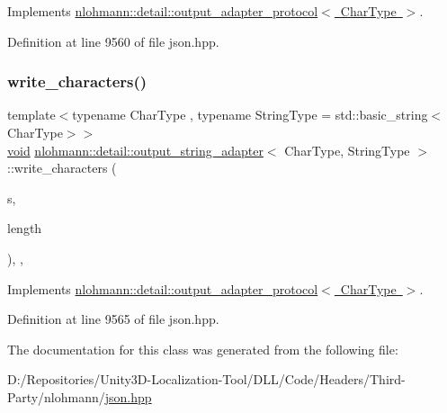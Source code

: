 Implements \mbox{\hyperlink{structnlohmann_1_1detail_1_1output__adapter__protocol_a3381896fe1be557f591de2e917cdc7d5}{nlohmann\+::detail\+::output\+\_\+adapter\+\_\+protocol$<$ Char\+Type $>$}}.



Definition at line 9560 of file json.\+hpp.

\mbox{\label{classnlohmann_1_1detail_1_1output__string__adapter_ab5ea4da075305d225dfd84ad997e8747}} 
\subsubsection{\texorpdfstring{write\_characters()}{write\_characters()}}
{\footnotesize\ttfamily template$<$typename Char\+Type , typename String\+Type  = std\+::basic\+\_\+string$<$\+Char\+Type$>$$>$ \\
\mbox{\hyperlink{namespacenlohmann_1_1detail_a59fca69799f6b9e366710cb9043aa77d}{void}} \mbox{\hyperlink{classnlohmann_1_1detail_1_1output__string__adapter}{nlohmann\+::detail\+::output\+\_\+string\+\_\+adapter}}$<$ Char\+Type, String\+Type $>$\+::write\+\_\+characters (\begin{DoxyParamCaption}\item[{const Char\+Type $\ast$}]{s,  }\item[{std\+::size\+\_\+t}]{length }\end{DoxyParamCaption})\hspace{0.3cm}{\ttfamily [inline]}, {\ttfamily [override]}, {\ttfamily [virtual]}}



Implements \mbox{\hyperlink{structnlohmann_1_1detail_1_1output__adapter__protocol_a2f410a164e0eda17cf6561114b0eee4a}{nlohmann\+::detail\+::output\+\_\+adapter\+\_\+protocol$<$ Char\+Type $>$}}.



Definition at line 9565 of file json.\+hpp.



The documentation for this class was generated from the following file\+:\begin{DoxyCompactItemize}
\item 
D\+:/\+Repositories/\+Unity3\+D-\/\+Localization-\/\+Tool/\+D\+L\+L/\+Code/\+Headers/\+Third-\/\+Party/nlohmann/\mbox{\hyperlink{json_8hpp}{json.\+hpp}}\end{DoxyCompactItemize}
